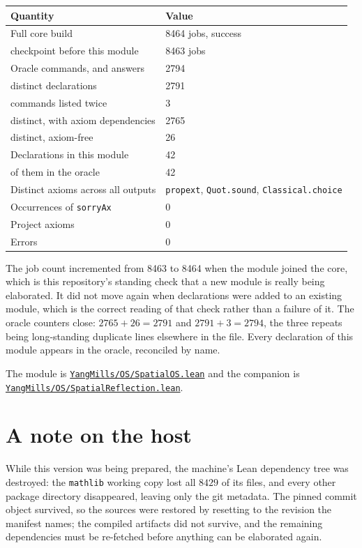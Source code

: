 \documentclass[11pt]{article}
\theoremstyle{definition}
\newcommand{\anchor}{2d0346b2cc75d1cdf2e0ea0cefea4a8ef3be9c84}
\newcommand{\repofile}[2]{%
  \href{https://github.com/lluiseriksson/THE-ERIKSSON-PROGRAMME/blob/\anchor/#1}{\nolinkurl{#2}}}
\begin{document}
\begin{center}
\begin{tabular}{ll}
\toprule
Quantity & Value \\
\midrule
Full core build & 8464 jobs, success \\
\quad checkpoint before this module & 8463 jobs \\
Oracle commands, and answers & 2794 \\
\quad distinct declarations & 2791 \\
\quad commands listed twice & 3 \\
\quad distinct, with axiom dependencies & 2765 \\
\quad distinct, axiom-free & 26 \\
Declarations in this module & 42 \\
\quad of them in the oracle & 42 \\
Distinct axioms across all outputs & \texttt{propext}, \texttt{Quot.sound},
  \texttt{Classical.choice} \\
Occurrences of \texttt{sorryAx} & 0 \\
Project axioms & 0 \\
Errors & 0 \\
\bottomrule
\end{tabular}
\end{center}

The job count incremented from 8463 to 8464 when the module joined the core,
which is this repository's standing check that a new module is really being
elaborated.  It did not move again when declarations were added to an existing
module, which is the correct reading of that check rather than a failure of it.
The oracle counters close: $2765+26=2791$ and $2791+3=2794$, the three repeats
being long-standing duplicate lines elsewhere in the file.  Every declaration of
this module appears in the oracle, reconciled by name.

The module is \repofile{YangMills/OS/SpatialOS.lean}{YangMills/OS/SpatialOS.lean}
and the companion is
\repofile{YangMills/OS/SpatialReflection.lean}{YangMills/OS/SpatialReflection.lean}.

\small
\section{A note on the host}\label{sec:host}

While this version was being prepared, the machine's Lean dependency tree was
destroyed: the \texttt{mathlib} working copy lost all $8429$ of its files, and
every other package directory disappeared, leaving only the git metadata.  The
pinned commit object survived, so the sources were restored by resetting to the
revision the manifest names; the compiled artifacts did not survive, and the
remaining dependencies must be re-fetched before anything can be elaborated
again.
\end{document}
